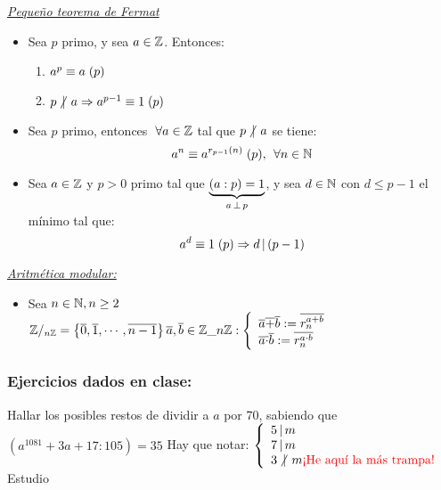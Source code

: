 \documentclass[12pt,a4paper, spanish]{article}
\begin{document}
\textit{\underline{Pequeño teorema de Fermat}}
\begin{itemize}
	\item Sea $p$ primo, y sea $a \en \enteros$. Entonces:
	      \begin{enumerate}[label=\arabic*.)]
		      \item $ \congruencia{a^p}{a}{p} $
		      \item $ p \noDivide a \entonces \congruencia{a^{p-1}}{1}{p} $
	      \end{enumerate}
	\item Sea $p$ primo, entonces $ \paratodo a \en \enteros$ tal que $ p \noDivide a$ se tiene:
	      \[
		      \congruencia{a^n}{a^{r_{p-1}(n)}}{p} ,\, \paratodo n \en \naturales
	      \]
	\item Sea $a \en \enteros$ y $p > 0$ primo tal que $\ub{(a:p) = 1}{a \cop p}$, y sea  $d \en \naturales$ con $d \leq p-1$
	      el mínimo tal que:
	      \[
		      \congruencia{a^d}{1}{p} \entonces d \divide (p-1)
	      \]
\end{itemize}
\textit{\underline{Aritmética modular:}}
\begin{itemize}
	\item Sea $n \en \naturales, n\geq2$\\
	      $
		      \enteros/_{n\enteros} = \set{\clase{0},\clase{1},\cdots, \clase{n-1} }\\
		      \clase{a},\clase{b} \en \enteros\_{n\enteros}:
		      \llave{l}{
		      \clase{a} \clase{+} \clase{b} := \overline{r_n^{a+b}} \\
		      \clase{a} \clase{\cdot} \clase{b} := \overline{r_n^{a\cdot b}}
		      }
	      $
\end{itemize}



\subsubsection*{Ejercicios dados en clase:}
\ejercicio Hallar los posibles restos de dividir a $a$ por 70,
sabiendo que $(a^{1081}+ 3a + 17 : 105) = 35$
\separadorCorto
Hay que notar:
$\llave{l}{
		5 \divide m\\
		7 \divide m\\
		3 \noDivide m \red{¡He aquí la más trampa!}
	}$\\
Estudio

\newpage

\end{document}
